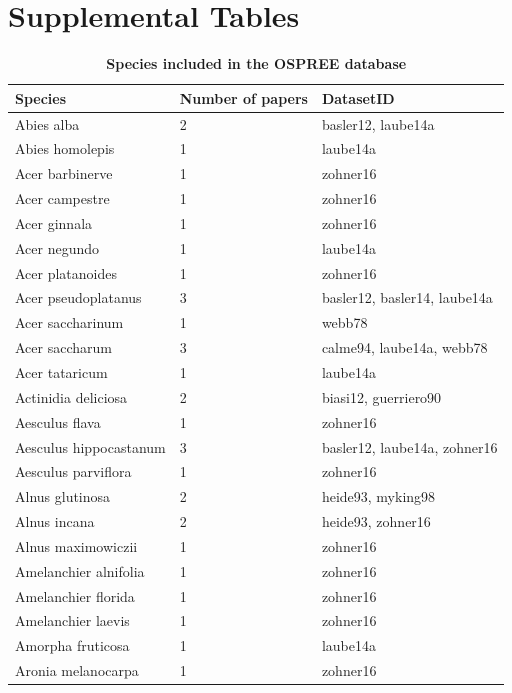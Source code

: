 \documentclass{article}
\begin{document}
\section* {Supplemental Tables}
\begin{footnotesize} 
\begingroup\footnotesize
\begin{longtable}{|p{}|p{}|p{}|}
\caption{\textbf{Species included in the OSPREE database}} \\ 
  \hline
Species & Number of papers & DatasetID \\ 
  \hline
Abies alba &   2 & basler12, laube14a \\ 
  Abies homolepis &   1 & laube14a \\ 
  Acer barbinerve &   1 & zohner16 \\ 
  Acer campestre &   1 & zohner16 \\ 
  Acer ginnala &   1 & zohner16 \\ 
  Acer negundo &   1 & laube14a \\ 
  Acer platanoides &   1 & zohner16 \\ 
  Acer pseudoplatanus &   3 & basler12, basler14, laube14a \\ 
  Acer saccharinum &   1 & webb78 \\ 
  Acer saccharum &   3 & calme94, laube14a, webb78 \\ 
  Acer tataricum &   1 & laube14a \\ 
  Actinidia deliciosa &   2 & biasi12, guerriero90 \\ 
  Aesculus flava &   1 & zohner16 \\ 
  Aesculus hippocastanum &   3 & basler12, laube14a, zohner16 \\ 
  Aesculus parviflora &   1 & zohner16 \\ 
  Alnus glutinosa &   2 & heide93, myking98 \\ 
  Alnus incana &   2 & heide93, zohner16 \\ 
  Alnus maximowiczii &   1 & zohner16 \\ 
  Amelanchier alnifolia &   1 & zohner16 \\ 
  Amelanchier florida &   1 & zohner16 \\ 
  Amelanchier laevis &   1 & zohner16 \\ 
  Amorpha fruticosa &   1 & laube14a \\ 
  Aronia melanocarpa &   1 & zohner16 \\ 

\end{longtable}
\end{footnotesize}
\end{document}
